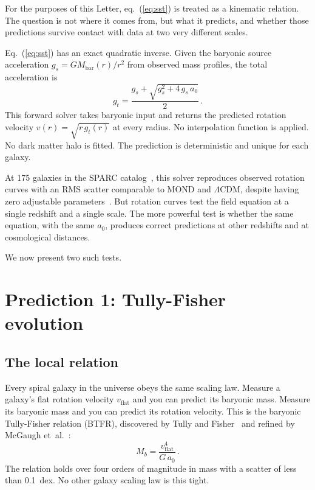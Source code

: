 \documentclass[a4paper,11pt]{article}
\begin{document}
For the purposes of this Letter, eq.~(\ref{eq:sst}) is treated as a kinematic relation. The question is not where it comes from, but what it predicts, and whether those predictions survive contact with data at two very different scales.

Eq.~(\ref{eq:sst}) has an exact quadratic inverse. Given the baryonic source acceleration $g_s = GM_{\mathrm{bar}}(r)/r^2$ from observed mass profiles, the total acceleration is
\begin{equation}
g_t = \frac{g_s + \sqrt{g_s^2 + 4\,g_s\,a_0}}{2}\,.
\label{eq:forward}
\end{equation}
This forward solver takes baryonic input and returns the predicted rotation velocity $v(r) = \sqrt{r\,g_t(r)}$ at every radius. No interpolation function is applied. No dark matter halo is fitted. The prediction is deterministic and unique for each galaxy.

At 175 galaxies in the SPARC catalog~\cite{lelli2016}, this solver reproduces observed rotation curves with an RMS scatter comparable to MOND and $\Lambda$CDM, despite having zero adjustable parameters~\cite{nelson2025a}. But rotation curves test the field equation at a single redshift and a single scale. The more powerful test is whether the same equation, with the same $a_0$, produces correct predictions at other redshifts and at cosmological distances.

We now present two such tests.

\section{Prediction 1: Tully-Fisher evolution}
\label{sec:tf}

\subsection{The local relation}

Every spiral galaxy in the universe obeys the same scaling law. Measure a galaxy's flat rotation velocity $v_{\mathrm{flat}}$ and you can predict its baryonic mass. Measure its baryonic mass and you can predict its rotation velocity. This is the baryonic Tully-Fisher relation (BTFR), discovered by Tully and Fisher~\cite{tully1977} and refined by McGaugh et~al.~\cite{mcgaugh2000}:
\begin{equation}
M_b = \frac{v_{\mathrm{flat}}^4}{G\,a_0}\,.
\label{eq:btfr}
\end{equation}
The relation holds over four orders of magnitude in mass with a scatter of less than 0.1~dex. No other galaxy scaling law is this tight.
\end{document}
